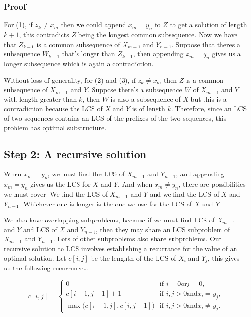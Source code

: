 \documentclass[11pt]{article}
\theoremstyle{definition}
\begin{document}
\subsubsection*{Proof}
For (1), if \(z_k \neq x_m\) then we could append \(x_m = y_n\) to \(Z\) to get a solution of length 
\(k+1\), this contradicts \(Z\) being the longest common subsequence.  Now we have that \(Z_{k-1}\) 
is a common subsequence of \(X_{m-1}\) and \(Y_{n-1}\).  Suppose that theres a subsequence 
\(W_{k-1}\) that's longer than \(Z_{k-1}\), then appending \(x_m = y_n\) gives us a longer subsequence 
which is again a contradiction.

Without loss of generality, for (2) and (3), if \(z_k \neq x_m\) then \(Z\) is a common subsequence 
of \(X_{m-1}\) and \(Y\).  Suppose there's a subsequence \(W\) of \(X_{m-1}\) and \(Y\) with length 
greater than \(k\), then \(W\) is also a subsequence of \(X\) but this is a contradiction because 
the LCS of \(X\) and \(Y\) is of length \(k\).  Therefore, since an LCS of two sequences contains 
an LCS of the prefixes of the two sequences, this problem has optimal substructure.

\subsection*{Step 2: A recursive solution}
When \(x_m = y_n\), we must find the LCS of \(X_{m-1}\) and \(Y_{n-1}\), and appending  \(x_m = y_n\) 
gives us the LCS for \(X\) and \(Y\).  And when \(x_m \neq y_n\), there are possibilities we must 
cover.  We find the LCS of \(X_{m-1}\) and \(Y\) and we find the LCS of \(X\) and \(Y_{n-1}\).  
Whichever one is longer is the one we use for the LCS of \(X\) and \(Y\).  

We also have overlapping subproblems, because if we must find LCS of \(X_{m-1}\) and \(Y\) and LCS 
of \(X\) and \(Y_{n-1}\), then they may share an LCS subproblem of \(X_{m-1}\) and \(Y_{n-1}\). 
Lots of other subproblems also share subproblems.  Our recursive solution to LCS involves establishing 
a recurrance for the value of an optimal solution.  Let \(c[i,j]\) be the lenghth of the LCS of 
\(X_i\) and \(Y_j\), this gives us the following recurrence\dots 

\[c[i,j] = \begin{cases}
  0 & \text{if } i=0 \text{or} j=0, \\ 
  c[i-1,j-1] + 1 & \text{if } i,j > 0 \text{and} x_i = y_j, \\ 
  \max \big(c[i-1,j], c[i,j-1]\big) & \text{if } i,j > 0 \text{and} x_i \neq y_j.
\end{cases}\]
\end{document}
